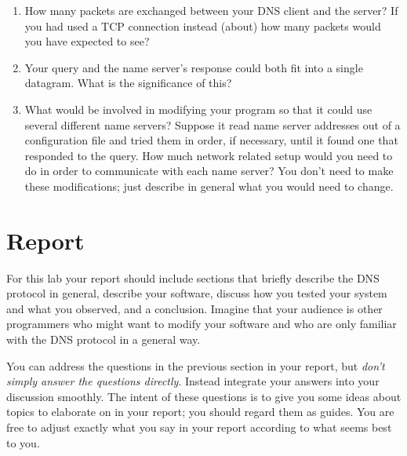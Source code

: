 \documentclass[twocolumn]{article}
\begin{document}
\begin{enumerate}
  
\item How many packets are exchanged between your DNS client and the server? If you had used a
TCP connection instead (about) how many packets would you have expected to see?
  
\item Your query and the name server's response could both fit into a single datagram. What is
the significance of this?
  
\item What would be involved in modifying your program so that it could use several different
name servers? Suppose it read name server addresses out of a configuration file and tried them
in order, if necessary, until it found one that responded to the query. How much network related
setup would you need to do in order to communicate with each name server? You don't need to make
these modifications; just describe in general what you would need to change.
  
\end{enumerate}

\section{Report}

For this lab your report should include sections that briefly describe the DNS protocol in
general, describe your software, discuss how you tested your system and what you observed, and a
conclusion. Imagine that your audience is other programmers who might want to modify your
software and who are only familiar with the DNS protocol in a general way.

You can address the questions in the previous section in your report, but \emph{don't simply
  answer the questions directly}. Instead integrate your answers into your discussion smoothly.
The intent of these questions is to give you some ideas about topics to elaborate on in your
report; you should regard them as guides. You are free to adjust exactly what you say in your
report according to what seems best to you.
\end{document}
